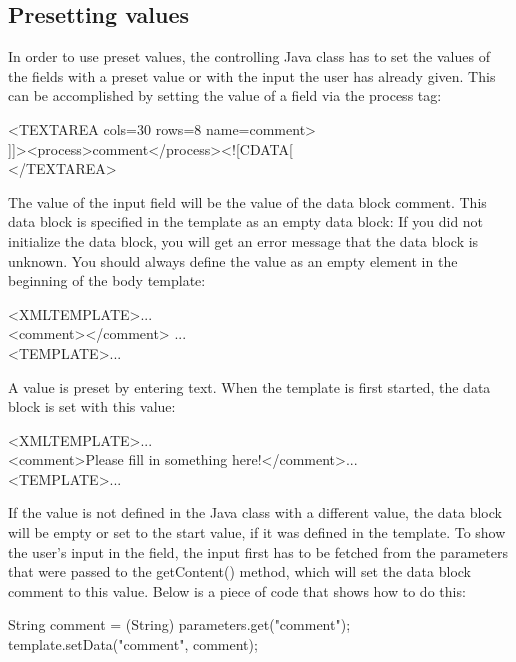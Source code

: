 \subsection {Presetting values}
In order to use preset values, the controlling Java class has to set the
values of the fields with a preset value or with the input the user has
already given. This can be accomplished by setting the value of a field
via the process tag:

\begin{java}
<TEXTAREA cols=30 rows=8 name=comment>\\
]]><process>comment</process><![CDATA[\\
</TEXTAREA>\\
\end{java}

The value of the input field will be the value of the data block comment.
This data block is specified in the template as an empty data block: If
you did not initialize the data block, you will get an error message
that the data block is unknown. You should always define the value  as
an empty element in the beginning of the body template:

\begin{xml}
<XMLTEMPLATE>...\\
<comment></comment> ...\\
<TEMPLATE>...\\
\end{xml}

A value is preset by entering text. When the template is first started,
the data block is set with this value:

\begin{xml}
<XMLTEMPLATE>...\\
<comment>Please fill in something here!</comment>...\\
<TEMPLATE>...\\
\end{xml}

If the value is not defined in the Java class with a different value,
the data block will be empty or set to the start value, if it was
defined in the template. To show the user's input in the field, the
input first has to be fetched from the parameters that were passed to
the getContent() method, which will set the data block comment to this
value. Below is a piece of code that shows how to do this:

\begin{xml}
String comment = (String) parameters.get("comment");\\
template.setData("comment", comment);\\
\end{xml}

